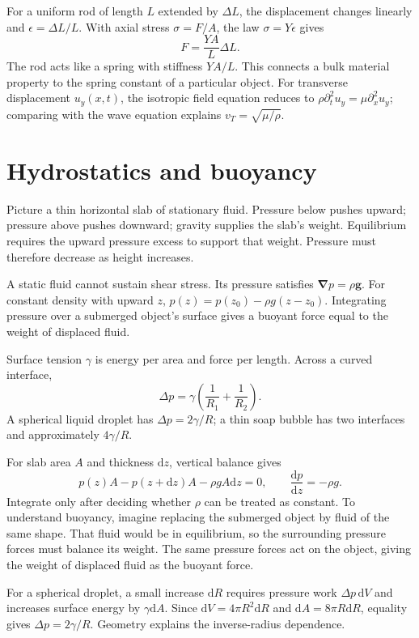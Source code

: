 \documentclass[11pt,oneside]{book}
\newcommand{\dd}{\mathrm{d}}
\newcommand{\vect}[1]{\boldsymbol{#1}}
\newcommand{\grad}{\boldsymbol{\nabla}}
\newcommand{\od}[2]{\frac{\dd #1}{\dd #2}}
\theoremstyle{reviewstyle}
\begin{document}
For a uniform rod of length $L$ extended by $\Delta L$, the displacement changes linearly and $\epsilon=\Delta L/L$. With axial stress $\sigma=F/A$, the law $\sigma=Y\epsilon$ gives
\begin{equation}
F=\frac{YA}{L}\Delta L.
\end{equation}
The rod acts like a spring with stiffness $YA/L$. This connects a bulk material property to the spring constant of a particular object. For transverse displacement $u_y(x,t)$, the isotropic field equation reduces to $\rho\partial_t^2u_y=\mu\partial_x^2u_y$; comparing with the wave equation explains $v_T=\sqrt{\mu/\rho}$.

\section{Hydrostatics and buoyancy}
Picture a thin horizontal slab of stationary fluid. Pressure below pushes upward; pressure above pushes downward; gravity supplies the slab's weight. Equilibrium requires the upward pressure excess to support that weight. Pressure must therefore decrease as height increases.

A static fluid cannot sustain shear stress. Its pressure satisfies
$\grad p=\rho\vect g$. For constant density with upward $z$, $p(z)=p(z_0)-\rho g(z-z_0)$. Integrating pressure over a submerged object's surface gives a buoyant force equal to the weight of displaced fluid.

Surface tension $\gamma$ is energy per area and force per length. Across a curved interface,
\begin{equation}
\Delta p=\gamma\left(\frac{1}{R_1}+\frac{1}{R_2}\right).
\end{equation}
A spherical liquid droplet has $\Delta p=2\gamma/R$; a thin soap bubble has two interfaces and approximately $4\gamma/R$.

For slab area $A$ and thickness $\dd z$, vertical balance gives
\begin{equation}
p(z)A-p(z+\dd z)A-\rho gA\dd z=0,
\qquad \od pz=-\rho g.
\end{equation}
Integrate only after deciding whether $\rho$ can be treated as constant. To understand buoyancy, imagine replacing the submerged object by fluid of the same shape. That fluid would be in equilibrium, so the surrounding pressure forces must balance its weight. The same pressure forces act on the object, giving the weight of displaced fluid as the buoyant force.

For a spherical droplet, a small increase $\dd R$ requires pressure work $\Delta p\,\dd V$ and increases surface energy by $\gamma\dd A$. Since $\dd V=4\pi R^2\dd R$ and $\dd A=8\pi R\dd R$, equality gives $\Delta p=2\gamma/R$. Geometry explains the inverse-radius dependence.
\end{document}
